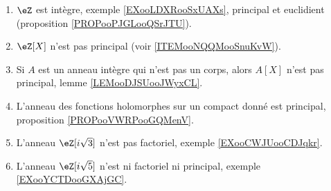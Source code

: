 
\begin{enumerate}
    \item
        \( \eZ\) est intègre, exemple \ref{EXooLDXRooSxUAXs}, principal et euclidient (proposition \ref{PROPooPJGLooQSrJTU}).
    \item
        \( \eZ[X]\) n'est pas principal (voir \ref{ITEMooNQQMooSnuKvW}).
    \item   \label{ITEMooNQQMooSnuKvW}
        Si \( A\) est un anneau intègre qui n'est pas un corps, alors \( A[X]\) n'est pas principal, lemme \ref{LEMooDJSUooJWyxCL}.
    \item
        L'anneau des fonctions holomorphes sur un compact donné est principal, proposition \ref{PROPooVWRPooGQMenV}.
    \item
        L'anneau \( \eZ[i\sqrt{ 3 }]\) n'est pas factoriel, exemple \ref{EXooCWJUooCDJqkr}.
    \item 
        L'anneau \( \eZ[i\sqrt{ 5 }]\) n'est ni factoriel ni principal, exemple \ref{EXooYCTDooGXAjGC}.
\end{enumerate}
